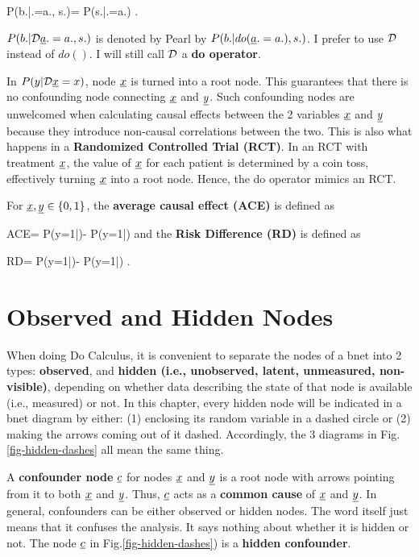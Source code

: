 \beq
P(b.|\cald \rva.=a., s.)=
{P(s.|\cald\rva.=a.)}
\;.
\eeq

$P(b.|\cald \rva.=a., s.)$
is denoted by Pearl  by
$P(b.|do(\rva.=a.), s.)$.
I prefer to
use ${\cal D}$
instead of $do()$.
I will still call ${\cal D}$
a {\bf do operator}.



In $P(y|\cald \rvx=x)$,
node $\rvx$ is turned
into a root node. This guarantees
that there is
no confounding node
connecting $\rvx$ and
$\rvy$. Such
confounding nodes
are unwelcomed
when calculating
causal effects
between
the 2 variables $\rvx$ and $\rvy$
 because they
 introduce
non-causal
correlations between
the two.
This is also
what happens
in a {\bf Randomized
Controlled Trial (RCT)}.
In an RCT
 with treatment $\rvx$,
the value
of $\rvx$ for each patient
is determined by a coin toss,
effectively
turning $\rvx$ into a root node.
Hence, the do operator mimics an RCT.



For $\rvx, \rvy\in \bool$,
 the {\bf average causal effect (ACE)}
is defined as

\beq
ACE=
P(y=1|\cald {})-
P(y=1|\cald {})
\eeq
and the
{\bf Risk Difference (RD)}
is defined as

\beq
RD=
P(y=1|)-
P(y=1|)
\;.
\eeq

\section{Observed and Hidden Nodes}

When
doing
Do Calculus,
it is
convenient
to separate
the nodes
of a bnet
into
2  types:
{\bf observed},
and {\bf hidden (i.e., unobserved, latent,
unmeasured, non-visible)},
depending
on
whether data
describing
the
state
of that
node
is available  (i.e., measured) or not.
In this chapter, every
hidden node will
be indicated
in a bnet
diagram by
either: (1)
enclosing
its random variable
in a dashed circle or
(2) making
the arrows
coming
out of it
dashed.
Accordingly,
the
3 diagrams
in
Fig.\ref{fig-hidden-dashes}
all mean the same thing.

A {\bf confounder node} $\rvc$
for nodes $\rvx$ and $\rvy$
is a root node
with arrows
pointing
from it to
both
$\rvx$ and $\rvy$.
Thus, $\rvc$ acts as a {\bf common cause}
of $\rvx$ and $\rvy$.
In general, confounders
can be either observed
or hidden nodes.
The word  itself
just means that it confuses
the analysis.
It says nothing about
whether it is hidden or not.
The node
$\rvc$
in Fig.\ref{fig-hidden-dashes})
is a {\bf hidden confounder}.

